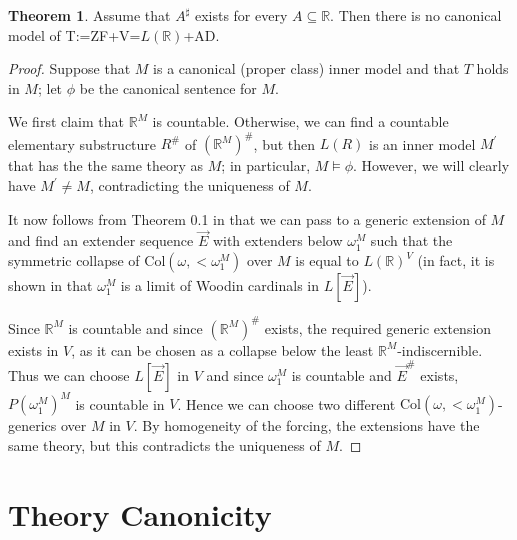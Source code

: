 \documentclass[a4paper,12pt]{amsart}
\theoremstyle{definition}
\newtheorem{thm}[fact]{Theorem}
\begin{document}
\begin{thm}{\label{L[R] and AD}}
Assume that $A^{\sharp}$ exists for every $A\subseteq\mathbb{R}$.
Then there is no canonical model of T:=ZF+V=$L(\mathbb{R})$+AD.
\end{thm}
\begin{proof}
Suppose that $M$ is a canonical (proper class) inner model 
and that $T$ holds in $M$; let $\phi$ be the canonical sentence for $M$.

We first claim that $\mathbb{R}^M$ is countable. 
Otherwise, we can find a countable elementary substructure $R^\#$ of $(\mathbb{R}^M)^\#$, but then $L(R)$ is an inner model $M^{\prime}$ that has the the same theory as $M$; in particular, $M\models\phi$.
However, we will clearly have $M^{\prime}\neq M$, contradicting the uniqueness of $M$. 


It now follows from Theorem 0.1 in \cite{ScSt} that we can pass to a generic extension of $M$ and find an extender 
sequence $\vec{E}$ with extenders below $\omega_1^M$ such that the symmetric 
collapse of $\mathrm{Col}(\omega,{<}\omega_1^M)$ over $M$ is equal to $L(\mathbb{R})^V$ (in fact, it is shown in \cite{ScSt} that $\omega_1^M$ is a limit of Woodin cardinals in $L[\vec{E}]$). 

Since $\mathbb{R}^M$ is countable and since $(\mathbb{R}^M)^\#$ exists, the required 
generic extension exists in $V$, as it can be chosen as a collapse below the least $\mathbb{R}^M$-indiscernible. 
Thus we can choose $L[\vec{E}]$ in $V$ and since $\omega_1^M$ is countable and $\vec{E}^\#$ 
exists, $P(\omega_1^M)^M$ is countable in $V$. Hence we can choose two different $\mathrm{Col}(\omega,{<}\omega_1^M)$-generics 
over $M$ in $V$. By homogeneity of the forcing, the extensions have the same theory, but this contradicts the uniqueness of $M$. 
\end{proof}
























\section{Theory Canonicity}
\end{document}

